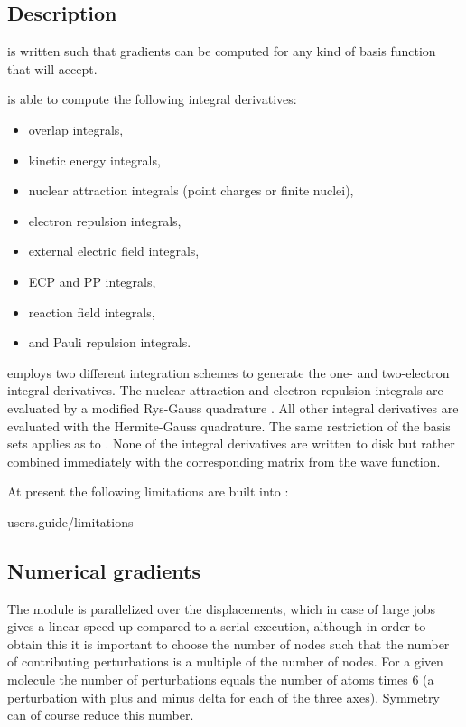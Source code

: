 \subsection{Description}
\label{UG:sec:alaska_description}
 is written such that gradients can be
computed for any kind of basis function that  will accept.

 is able to compute the following integral derivatives:

\begin{itemize}
\item
overlap integrals,
\item
kinetic energy integrals,
\item
nuclear attraction integrals (point charges or finite nuclei),
\item
electron repulsion integrals,
\item
external electric field integrals,
\item
ECP and PP integrals,
\item
reaction field integrals,
\item
and Pauli repulsion integrals.
\end{itemize}


 employs
two different integration schemes
to generate the
one- and two-electron integral derivatives.
The nuclear attraction and electron repulsion
integrals are evaluated by a modified Rys-Gauss quadrature \cite{Alaska}.
All other integral
derivatives are evaluated with the Hermite-Gauss quadrature. The same
restriction of the basis sets applies as to .
None of the integral derivatives are written to disk but rather combined
immediately with the corresponding matrix from the wave function.

At present the following limitations are built into :

 {users.guide/limitations}

\subsection{Numerical gradients}
The module is parallelized over the displacements, which in case of large jobs gives a linear
speed up compared to a serial execution, although in order to obtain this it is important to
choose the number of nodes such that the number of contributing perturbations is a multiple of
the number of nodes. For a given molecule the number of perturbations equals the number of atoms
times 6 (a perturbation with plus and minus delta for each of the three axes). Symmetry can of
course reduce this number.


